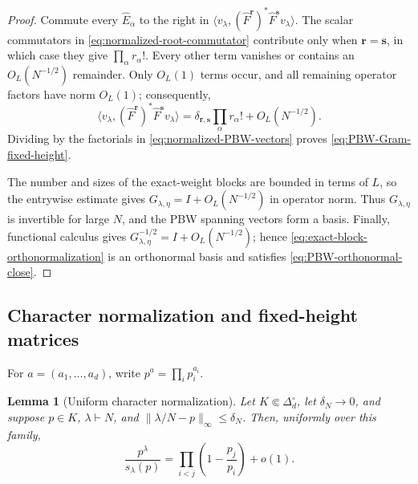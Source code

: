 \documentclass[11pt]{article}
\newtheorem{lemma}[lemma]{Lemma}
\theoremstyle{remark}
\theoremstyle{plain}
\begin{document}
\begin{proof}
Commute every \(\widehat E_\alpha\) to the right in
\(\langle v_\lambda,(\widehat F^{\mathbf r})^*
\widehat F^{\mathbf s}v_\lambda\rangle\).  The scalar commutators in
\eqref{eq:normalized-root-commutator} contribute only when
\(\mathbf r=\mathbf s\), in which case they give
\(\prod_\alpha r_\alpha!\).  Every other term vanishes or contains an
\(O_L(N^{-1/2})\) remainder.  Only \(O_L(1)\) terms occur, and all remaining
operator factors have norm \(O_L(1)\); consequently,
\[
  \langle v_\lambda,(\widehat F^{\mathbf r})^*
  \widehat F^{\mathbf s}v_\lambda\rangle
  =\delta_{\mathbf r,\mathbf s}\prod_\alpha r_\alpha!
   +O_L(N^{-1/2}).
\]
Dividing by the factorials in \eqref{eq:normalized-PBW-vectors} proves
\eqref{eq:PBW-Gram-fixed-height}.

The number and sizes of the exact-weight blocks are bounded in terms of
\(L\), so the entrywise estimate gives
\(G_{\lambda,\eta}=I+O_L(N^{-1/2})\) in operator norm.  Thus
\(G_{\lambda,\eta}\) is invertible for large \(N\), and the PBW spanning
vectors form a basis.  Finally, functional calculus gives
\(G_{\lambda,\eta}^{-1/2}=I+O_L(N^{-1/2})\); hence
\eqref{eq:exact-block-orthonormalization} is an orthonormal basis and
satisfies \eqref{eq:PBW-orthonormal-close}.
\end{proof}

\subsection{Character normalization and fixed-height matrices}

For \(a=(a_1,\ldots,a_d)\), write \(p^a=\prod_i p_i^{a_i}\).

\begin{lemma}[Uniform character normalization]
\label{lem:uniform-character-normalization}
Let \(K\Subset\Delta_d^\circ\), let \(\delta_N\to0\), and suppose
\(p\in K\), \(\lambda\vdash N\), and
\(\|\lambda/N-p\|_\infty\le\delta_N\).  Then, uniformly over this family,
\begin{equation}\label{eq:uniform-character-normalization}
  \frac{p^\lambda}{s_\lambda(p)}
  =\prod_{i<j}\left(1-\frac{p_j}{p_i}\right)+o(1).
\end{equation}
\end{lemma}
\end{document}
